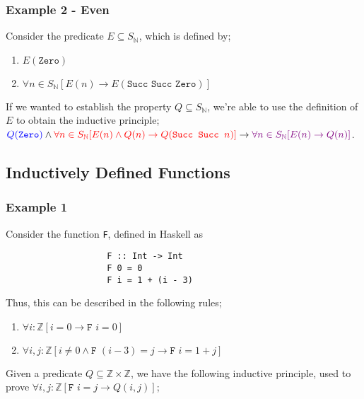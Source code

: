 \documentclass[a4paper, 12pt]{article}
\begin{document}
            \subsubsection*{Example 2 - Even}
                Consider the predicate $E \subseteq S_\mathbb{N}$, which is defined by;
                \begin{enumerate}[R1]
                    \itemsep0em
                    \item $E(\texttt{Zero})$
                    \item $\forall n \in S_\mathbb{N} [E(n) \rightarrow E(\texttt{Succ Succ Zero})]$
                \end{enumerate}
                If we wanted to establish the property $Q \subseteq S_\mathbb{N}$, we're able to use the definition of $E$ to obtain the inductive principle; $\textcolor{blue}{Q(\texttt{Zero})} \land \textcolor{red}{\forall n \in S_\mathbb{N} [E(n) \land Q(n) \rightarrow Q(\texttt{Succ Succ } n)]} \rightarrow \textcolor{violet}{\forall n \in S_\mathbb{N} [E(n) \rightarrow Q(n)]}$.
        \subsection*{Inductively Defined Functions}
            \subsubsection*{Example 1}
                Consider the function \texttt{F}, defined in Haskell as
                \begin{lstlisting}
                    F :: Int -> Int
                    F 0 = 0
                    F i = 1 + (i - 3)
                \end{lstlisting}
                Thus, this can be described in the following rules;
                \begin{enumerate}[R1]
                    \itemsep0em
                    \item $\forall i : \mathbb{Z} [i = 0 \rightarrow \texttt{F } i = 0]$
                    \item $\forall i, j : \mathbb{Z} [i \neq 0 \land \texttt{F } (i - 3) = j \rightarrow \texttt{F } i = 1 + j]$
                \end{enumerate}
                Given a predicate $Q \subseteq \mathbb{Z} \times \mathbb{Z}$, we have the following inductive principle, used to prove $\forall i, j : \mathbb{Z} [\texttt{F } i = j \rightarrow Q(i, j)]$;
                \medskip
\end{document}
